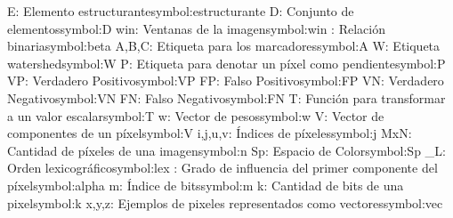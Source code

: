 \begin{tabbing}
\newsymbol E: {Elemento estructurante}{symbol:estructurante}
\newsymbol D: {Conjunto de elementos}{symbol:D}
\newsymbol win: {Ventanas de la imagen}{symbol:win}
\newsymbol \beta: {Relación binaria}{symbol:beta}
\newsymbol A,B,C: {Etiqueta para los marcadores}{symbol:A}
\newsymbol W: {Etiqueta watershed}{symbol:W}
\newsymbol P: {Etiqueta para denotar un píxel como pendiente}{symbol:P}
\newsymbol VP: {Verdadero Positivo}{symbol:VP}
\newsymbol FP: {Falso Positivo}{symbol:FP}
\newsymbol VN: {Verdadero Negativo}{symbol:VN}
\newsymbol FN: {Falso Negativo}{symbol:FN}
\newsymbol T: {Función para transformar a un valor escalar}{symbol:T}
\newsymbol w: {Vector de pesos}{symbol:w}
\newsymbol V: {Vector de componentes de un píxel}{symbol:V}
\newsymbol i,j,u,v: {Índices de píxeles}{symbol:j}
\newsymbol MxN: {Cantidad de píxeles de una imagen}{symbol:n}
\newsymbol Sp: {Espacio de Color}{symbol:Sp}
\newsymbol \leq_{L}: {Orden lexicográfico}{symbol:lex}
\newsymbol \alpha: {Grado de influencia del primer componente del píxel}{symbol:alpha}
\newsymbol m: {Índice de bits}{symbol:m}
\newsymbol k: {Cantidad de bits de una pixel}{symbol:k}
\newsymbol x,y,z: {Ejemplos de pixeles representados como vectores}{symbol:vec}

\end{tabbing}